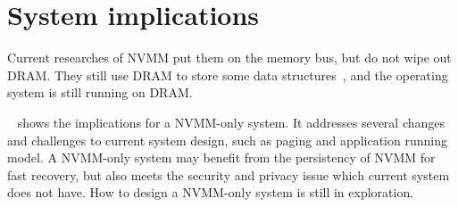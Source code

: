 \section{System implications} 
\label{sec:implications}

Current researches of NVMM put them on the memory bus, but do not wipe out
DRAM. They still use DRAM to store some data structures~\cite{BPFS, PMFS},
and the operating system is still running on DRAM.

~\cite{systemimplications} shows the implications for a NVMM-only
system. It addresses several changes and challenges to current system design,
such as paging and application running model. A NVMM-only system may benefit
from the persistency of NVMM for fast recovery, but also meets the security
and privacy issue which current system does not have. How to design a
NVMM-only system is still in exploration.
